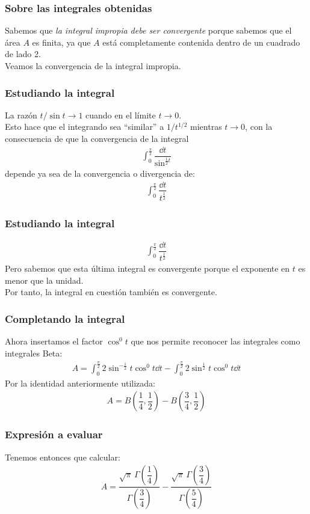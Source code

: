 \begin{frame}
\frametitle{Sobre las integrales obtenidas}
Sabemos que \emph{la integral impropia debe ser convergente} porque sabemos que el área $A$ es finita, ya que $A$ está completamente contenida dentro de un cuadrado de lado 2.
\\
\bigskip
\pause
Veamos la convergencia de la integral impropia.
\end{frame}
\begin{frame}
\frametitle{Estudiando la integral}
La razón $t/\sin t \to 1$ cuando en el límite $t \to 0$.
\\
\bigskip
\pause
Esto hace que el integrando sea \enquote{similar} a $1 / t^{1/2}$ mientras $t \to 0$, con la consecuencia de que la convergencia de la integral
\begin{align*}
\int_{0}^{\frac{\pi}{2}} \dfrac{\dd{t}}{\sin^{\frac{1}{2} t}}
\end{align*}
depende ya sea de la convergencia o divergencia de:
\begin{align*}
\int_{0}^{\frac{\pi}{2}} \dfrac{\dd{t}}{t^{\frac{1}{2}}}
\end{align*}
\end{frame}
\begin{frame}
\frametitle{Estudiando la integral}
\begin{align*}
\int_{0}^{\frac{\pi}{2}} \dfrac{\dd{t}}{t^{\frac{1}{2}}}
\end{align*}
Pero sabemos que esta última integral es convergente porque el exponente en $t$ es menor que la unidad.
\\
\bigskip
\pause
Por tanto, la integral en cuestión también es convergente.
\end{frame}
\begin{frame}
\frametitle{Completando la integral}
Ahora insertamos el factor $\cos^{0} t$ que nos permite reconocer las integrales como integrales Beta:
\begin{align*}
A = \int_{0}^{\frac{\pi}{2}} 2 \sin^{-\frac{1}{2}} t \cos^{0} t \dd{t} - \int_{0}^{\frac{\pi}{2}} 2 \sin^{\frac{1}{2}} t \cos^{0} t \dd{t}
\end{align*}
\pause
Por la identidad anteriormente utilizada:
\begin{align*}
A = B \left( \dfrac{1}{4}, \dfrac{1}{2} \right) - B \left( \dfrac{3}{4}, \dfrac{1}{2} \right)
\end{align*}
\end{frame}
\begin{frame}
\frametitle{Expresión a evaluar}
Tenemos entonces que calcular:
\begin{align*}
A = \dfrac{\sqrt{\pi} \, \Gamma \left( \dfrac{1}{4} \right)}{\Gamma \left( \dfrac{3}{4} \right)} - \dfrac{\sqrt{\pi} \, \Gamma \left( \dfrac{3}{4} \right)}{\Gamma \left( \dfrac{5}{4} \right)}
\end{align*}
\end{frame}
